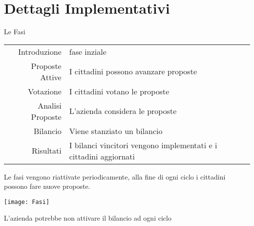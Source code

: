 \section{Dettagli Implementativi}

\begin{frame}{Le Fasi}
  \begin{table}
    \renewcommand\arraystretch{1.4}

    \begin{tabular}{@{\,}r <{\hskip 2pt} !{\foo} >{\raggedright\arraybackslash}p{5cm}}

      \addlinespace[1.5ex]
      Introduzione     & \small{fase inziale}                                                      \\
      Proposte Attive  & \small{I cittadini possono avanzare proposte}                             \\
      Votazione        & \small{I cittadini votano le proposte  }                                  \\
      Analisi Proposte & \small{L'azienda considera le proposte}                                   \\
      Bilancio         & \small{Viene stanziato un bilancio }                                      \\
      Risultati        & \small{I bilanci vincitori vengono implementati e i cittadini aggiornati} \\
    \end{tabular}
  \end{table}
\end{frame}
\begin{frame}
  Le fasi vengono riattivate periodicamente, alla fine di ogni ciclo i cittadini possono fare nuove proposte.


  \begin{center}
    \texttt{[image: Fasi]}
  \end{center}
  \pause
  L'azienda potrebbe non attivare il bilancio ad ogni ciclo
\end{frame}
